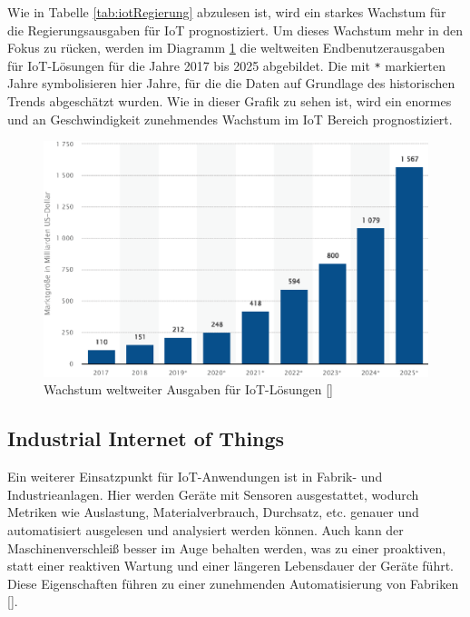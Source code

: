 Wie in Tabelle \ref{tab:iotRegierung} abzulesen ist, wird ein starkes Wachstum für die Regierungsausgaben für IoT prognostiziert. Um dieses Wachstum mehr in den Fokus zu rücken, werden im Diagramm \ref{fig:IoT_Ausgaben} die weltweiten Endbenutzerausgaben für IoT-Lösungen für die Jahre 2017 bis 2025 abgebildet. Die mit \verb|*| markierten Jahre symbolisieren hier Jahre, für die die Daten auf Grundlage des historischen Trends abgeschätzt wurden. Wie in dieser Grafik zu sehen ist, wird ein enormes und an Geschwindigkeit zunehmendes Wachstum im IoT Bereich prognostiziert.
%
\begin{figure}[htbp]
	\centering\includegraphics[width=1.0\textwidth]{images/02/IoT_Ausgaben.eps}
    \caption{Wachstum weltweiter Ausgaben für IoT-Lösungen [\cite{iotSpending}]}
    \label{fig:IoT_Ausgaben}
\end{figure}

\subsection{Industrial Internet of Things}
\label{subsec:iot_iiot}

Ein weiterer Einsatzpunkt für IoT-Anwendungen ist in Fabrik- und Industrieanlagen. Hier werden Geräte mit Sensoren ausgestattet, wodurch Metriken wie Auslastung, Materialverbrauch, Durchsatz, etc. genauer und automatisiert ausgelesen und analysiert werden können. Auch kann der Maschinenverschleiß besser im Auge behalten werden, was zu einer proaktiven, statt einer reaktiven Wartung und einer längeren Lebensdauer der Geräte führt. Diese Eigenschaften führen zu einer zunehmenden Automatisierung von Fabriken [\cite{iotAnderl}].

